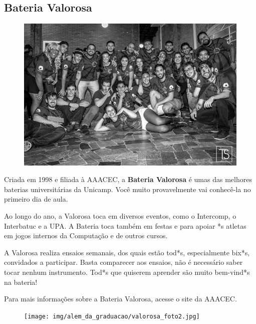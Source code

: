 \subsection{Bateria Valorosa}

\begin{figure}[H]
    \centering
    \includegraphics[scale=0.27]{img/alem_da_graduacao/valorosa_foto1.jpg}
\end{figure}

Criada em 1998 e filiada à AAACEC, a \textbf{Bateria Valorosa} é umas das
melhores baterias universitárias da Unicamp. Você muito provavelmente vai
conhecê-la no primeiro dia de aula.

Ao longo do ano, a Valorosa toca em diversos eventos, como o Intercomp, o
Interbatuc e a UPA. A Bateria toca também em festas e para apoiar *s atletas em
jogos internos da Computação e de outros cursos.

A Valorosa realiza ensaios semanais, dos quais estão tod*s, especialmente bix*s,
convidados a participar. Basta comparecer aos ensaios, não é necessário saber
tocar nenhum instrumento. Tod*s que quiserem aprender são muito bem-vind*s na
bateria!

Para mais informações sobre a Bateria Valorosa, acesse o site da AAACEC.

\begin{figure}[H]
    \centering
    \texttt{[image: img/alem\_da\_graduacao/valorosa\_foto2.jpg]}
\end{figure}
